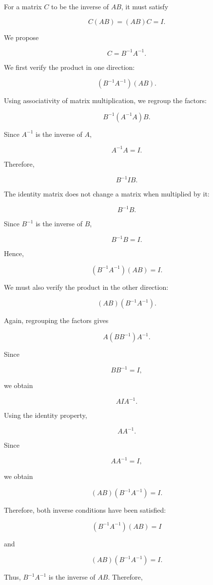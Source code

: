\documentclass[12pt]{article}
\begin{document}
	For a matrix $C$ to be the inverse of $AB$, it must satisfy
	
	\[
	C(AB)=(AB)C=I.
	\]
	
	We propose
	
	\[
	C=B^{-1}A^{-1}.
	\]
	
	We first verify the product in one direction:
	
	\[
	(B^{-1}A^{-1})(AB).
	\]
	
	Using associativity of matrix multiplication, we regroup the factors:
	
	\[
	B^{-1}(A^{-1}A)B.
	\]
	
	Since $A^{-1}$ is the inverse of $A$,
	
	\[
	A^{-1}A=I.
	\]
	
	Therefore,
	
	\[
	B^{-1}IB.
	\]
	
	The identity matrix does not change a matrix when multiplied by it:
	
	\[
	B^{-1}B.
	\]
	
	Since $B^{-1}$ is the inverse of $B$,
	
	\[
	B^{-1}B=I.
	\]
	
	Hence,
	
	\[
	\boxed{(B^{-1}A^{-1})(AB)=I}.
	\]
	
	We must also verify the product in the other direction:
	
	\[
	(AB)(B^{-1}A^{-1}).
	\]
	
	Again, regrouping the factors gives
	
	\[
	A(BB^{-1})A^{-1}.
	\]
	
	Since
	
	\[
	BB^{-1}=I,
	\]
	
	we obtain
	
	\[
	AIA^{-1}.
	\]
	
	Using the identity property,
	
	\[
	AA^{-1}.
	\]
	
	Since
	
	\[
	AA^{-1}=I,
	\]
	
	we obtain
	
	\[
	\boxed{(AB)(B^{-1}A^{-1})=I}.
	\]
	
	Therefore, both inverse conditions have been satisfied:
	
	\[
	(B^{-1}A^{-1})(AB)=I
	\]
	
	and
	
	\[
	(AB)(B^{-1}A^{-1})=I.
	\]
	
	Thus, $B^{-1}A^{-1}$ is the inverse of $AB$. Therefore,
	
\end{document}
